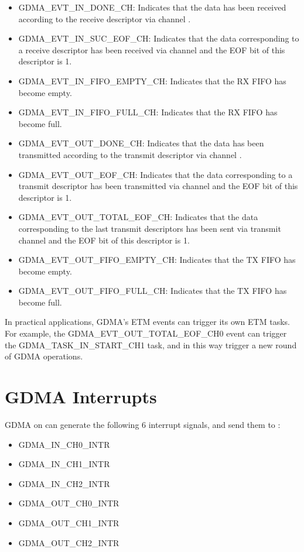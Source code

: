 \documentclass[main\_\_EN.tex]{subfiles}
\begin{document}
\begin{itemize}
    \item GDMA\_EVT\_IN\_DONE\_CH: Indicates that the data has been received according to the receive descriptor via channel .
    \item GDMA\_EVT\_IN\_SUC\_EOF\_CH: Indicates that the data corresponding to a receive descriptor has been received via channel  and the EOF bit of this descriptor is 1.
    \item GDMA\_EVT\_IN\_FIFO\_EMPTY\_CH: Indicates that the RX FIFO has become empty.
    \item GDMA\_EVT\_IN\_FIFO\_FULL\_CH: Indicates that the RX FIFO has become full.
    \item GDMA\_EVT\_OUT\_DONE\_CH: Indicates that the data has been transmitted according to the transmit descriptor via channel .
    \item GDMA\_EVT\_OUT\_EOF\_CH: Indicates that the data corresponding to a transmit descriptor has been transmitted via channel  and the EOF bit of this descriptor is 1.
    \item GDMA\_EVT\_OUT\_TOTAL\_EOF\_CH: Indicates that the data corresponding to the last transmit descriptors has been sent via transmit channel  and the EOF bit of this descriptor is 1.
    \item GDMA\_EVT\_OUT\_FIFO\_EMPTY\_CH: Indicates that the TX FIFO has become empty.
    \item GDMA\_EVT\_OUT\_FIFO\_FULL\_CH: Indicates that the TX FIFO has become full.
\end{itemize}

In practical applications, GDMA's ETM events can trigger its own ETM tasks. For example, the GDMA\_EVT\_OUT\_TOTAL\_EOF\_CH0 event can trigger the GDMA\_TASK\_IN\_START\_CH1 task, and in this way trigger a new round of GDMA operations.

\section{GDMA Interrupts}

GDMA on \chipname{} can generate the following 6 interrupt signals, and send them to \textit{}:
\begin{itemize}
    \item GDMA\_IN\_CH0\_INTR
    \item GDMA\_IN\_CH1\_INTR
    \item GDMA\_IN\_CH2\_INTR
    \item GDMA\_OUT\_CH0\_INTR
    \item GDMA\_OUT\_CH1\_INTR
    \item GDMA\_OUT\_CH2\_INTR
\end{itemize}
\end{document}
